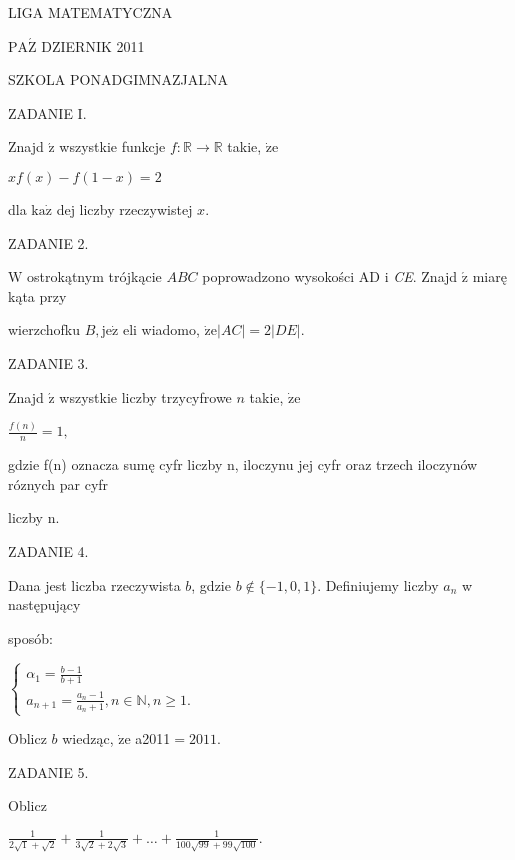 \documentclass[a4paper,12pt]{article}
\begin{document}
LIGA MATEMATYCZNA

$\mathrm{P}\mathrm{A}\acute{\mathrm{Z}}$ DZIERNIK 2011

SZKOLA PONADGIMNAZJALNA

ZADANIE I.

Znajd $\acute{\mathrm{z}}$ wszystkie funkcje $f:\mathbb{R}\rightarrow \mathbb{R}$ takie, $\dot{\mathrm{z}}\mathrm{e}$

$xf(x)-f(1-x)=2$

dla $\mathrm{k}\mathrm{a}\dot{\mathrm{z}}$ dej liczby rzeczywistej $x.$

ZADANIE 2.

$\mathrm{W}$ ostrokątnym trójkącie $ABC$ poprowadzono wysokości AD $\mathrm{i}$ {\it CE}. Znajd $\acute{\mathrm{z}}$ miarę kąta przy

wierzchofku $B, \mathrm{j}\mathrm{e}\dot{\mathrm{z}}$ eli wiadomo, $\dot{\mathrm{z}}\mathrm{e}|AC|=2|DE|.$

ZADANIE 3.

Znajd $\acute{\mathrm{z}}$ wszystkie liczby trzycyfrowe $n$ takie, $\dot{\mathrm{z}}\mathrm{e}$

$\displaystyle \frac{f(n)}{n}=1,$

gdzie f(n) oznacza sumę cyfr liczby n, iloczynu jej cyfr oraz trzech iloczynów róznych par cyfr

liczby n.

ZADANIE 4.

Dana jest liczba rzeczywista $b$, gdzie $b \not\in \{-1,0,1\}$. Definiujemy liczby $a_{n}$ w następujący

sposób:

$\left\{\begin{array}{l}
\alpha_{1}=\frac{b-1}{b+1}\\
a_{n+1}=\frac{a_{n}-1}{a_{n}+1},n\in \mathbb{N},n\geq 1.
\end{array}\right.$

Oblicz $b$ wiedząc, $\dot{\mathrm{z}}\mathrm{e}$ a2011$=2011.$

ZADANIE 5.

Oblicz

$\displaystyle \frac{1}{2\sqrt{1}+\sqrt{2}}+\frac{1}{3\sqrt{2}+2\sqrt{3}}+\ldots+\frac{1}{100\sqrt{99}+99\sqrt{100}}.$
\end{document}
